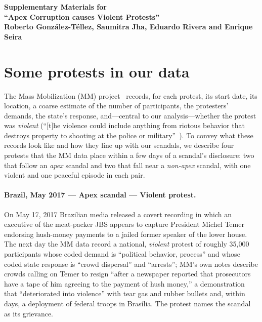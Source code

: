 \documentclass[11pt]{article}
\newcommand{\papertitle}{Apex Corruption causes Violent Protests}
\begin{document}
\clearpage

\appendix
\renewcommand{\thesection}{S\arabic{section}}
\renewcommand{\thesubsection}{S\arabic{section}.\arabic{subsection}}
\renewcommand{\thetable}{S\arabic{table}}
\renewcommand{\thefigure}{S\arabic{figure}}
\setcounter{section}{0}
\setcounter{table}{0}
\setcounter{figure}{0}

\begin{center}
    {\Large\bfseries Supplementary Materials for \\ ``\papertitle'' \\ \small{Roberto Gonz\'alez-T\'ellez, Saumitra Jha, Eduardo Rivera and Enrique Seira}}
\end{center}
\bigskip

\section{Some protests in our data}\label{sup:protests_examples}

The Mass Mobilization (MM) project~\citep{clark2016mass} records, for each protest, its start date, its location, a coarse estimate of the number of participants, the protesters' demands, the state's response, and---central to our analysis---whether the protest was \emph{violent} (``[t]he violence could include anything from riotous behavior that destroys property to shooting at the police or military''~\citep{clark2016mass}). To convey what these records look like and how they line up with our scandals, we describe four protests that the MM data place within a few days of a scandal's disclosure: two that follow an \emph{apex} scandal and two that fall near a \emph{non-apex} scandal, with one violent and one peaceful episode in each pair.

\paragraph{Brazil, May 2017 --- Apex scandal --- Violent protest.} On May 17, 2017 Brazilian media released a covert recording in which an executive of the meat-packer JBS appears to capture President Michel Temer endorsing hush-money payments to a jailed former speaker of the lower house. The next day the MM data record a national, \emph{violent} protest of roughly 35,000 participants whose coded demand is ``political behavior, process'' and whose coded state response is ``crowd dispersal'' and ``arrests''; MM's own notes describe crowds calling on Temer to resign ``after a newspaper reported that prosecutors have a tape of him agreeing to the payment of hush money,'' a demonstration that ``deteriorated into violence'' with tear gas and rubber bullets and, within days, a deployment of federal troops in Bras\'ilia. The protest names the scandal as its grievance.
\end{document}
